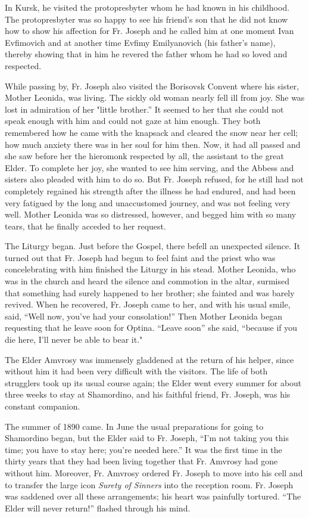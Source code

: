 In Kursk, he visited the protopresbyter whom he had known in his childhood. The protopresbyter was so happy to see his friend's son that he did not know how to show his affection for Fr. Joseph and he called him at one moment Ivan Evfimovich and at another time Evfimy Emilyanovich (his father's name), thereby showing that in him he revered the father whom he had so loved and respected.

While passing by, Fr. Joseph also visited the Borisovsk Convent where his sister, Mother Leonida, was living. The sickly old woman nearly fell ill from joy. She was lost in admiration of her "little brother.” It seemed to her that she could not speak enough with him and could not gaze at him enough. They both remembered how he came with the knapsack and cleared the snow near her cell; how much anxiety there was in her soul for him then. Now, it had all passed and she saw before her the hieromonk respected by all, the assistant to the great Elder. To complete her joy, she wanted to see him serving, and the Abbess and sisters also pleaded with him to do so. But Fr. Joseph refused, for he still had not completely regained his strength after the illness he had endured, and had been very fatigued by the long and unaccustomed journey, and was not feeling very well. Mother Leonida was so distressed, however, and begged him with so many tears, that he finally acceded to her request.

The Liturgy began. Just before the Gospel, there befell an unexpected silence. It turned out that Fr. Joseph had begun to feel faint and the priest who was concelebrating with him finished the Liturgy in his stead. Mother Leonida, who was in the church and heard the silence and commotion in the altar, surmised that something had surely happened to her brother; she fainted and was barely revived. When he recovered, Fr. Joseph came to her, and with his usual smile, said, “Well now, you've had your consolation!” Then Mother Leonida began requesting that he leave soon for Optina. “Leave soon” she said, “because if you die here, I'll never be able to bear it."

The Elder Amvrosy was immensely gladdened at the return of his helper, since without him it had been very difficult with the visitors. The life of both strugglers took up its usual course again; the Elder went every summer for about three weeks to stay at Shamordino, and his faithful friend, Fr. Joseph, was his constant companion.

The summer of 1890 came. In June the usual preparations for going to Shamordino began, but the Elder said to Fr. Joseph, “I'm not taking you this time; you have to stay here; you’re needed here.” It was the first time in the thirty years that they had been living together that Fr. Amvrosy had gone without him. Moreover, Fr. Amvrosy ordered Fr. Joseph to move into his cell and to transfer the large icon \textit{Surety of Sinners} into the reception room. Fr. Joseph was saddened over all these arrangements; his heart was painfully tortured. “The Elder will never return!” flashed through his mind.

